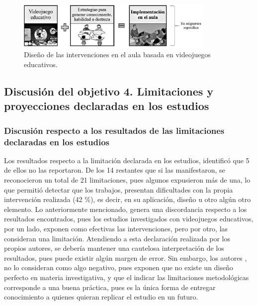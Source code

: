 \documentclass[spanish]{textolivre}
\begin{document}
\begin{figure}[htbp]
 \centering
 \includegraphics[width=0.85\textwidth]{Fig5.jpg}
 \caption{Diseño de las intervenciones en el aula basada en videojuegos educativos.}
 \label{fig05}
\end{figure}

\subsection{Discusión del objetivo 4. Limitaciones y proyecciones declaradas en los estudios}\label{sec-conclusao}

\subsubsection{Discusión respecto a los resultados de las limitaciones declaradas en los estudios}
Los resultados respecto a la limitación declarada en los estudios, identificó que 5 de ellos no las reportaron. De los 14 restantes que si las manifestaron, se reconocieron un total de 21 limitaciones, pues algunos expusieron más de una, lo que permitió detectar que los trabajos, presentan dificultades con la propia intervención realizada (42 \%), es decir, en su aplicación, diseño u otro algún otro elemento. Lo anteriormente mencionado, genera una discordancia respecto a los resultados encontrados, pues los estudios investigados con videojuegos educativos, por un lado, exponen como efectivas las intervenciones, pero por otro, las consideran una limitación. Atendiendo a esta declaración realizada por los propios autores, se debería mantener una cautelosa interpretación de los resultados, pues puede existir algún margen de error. Sin embargo, los autores \textcite{soto_estudios_2020}, no lo consideran como algo negativo, pues exponen que no existe un diseño perfecto en materia investigativa, y que el indicar las limitaciones metodológicas corresponde a una buena práctica, pues es la única forma de entregar conocimiento a quienes quieran replicar el estudio en un futuro.
\end{document}
